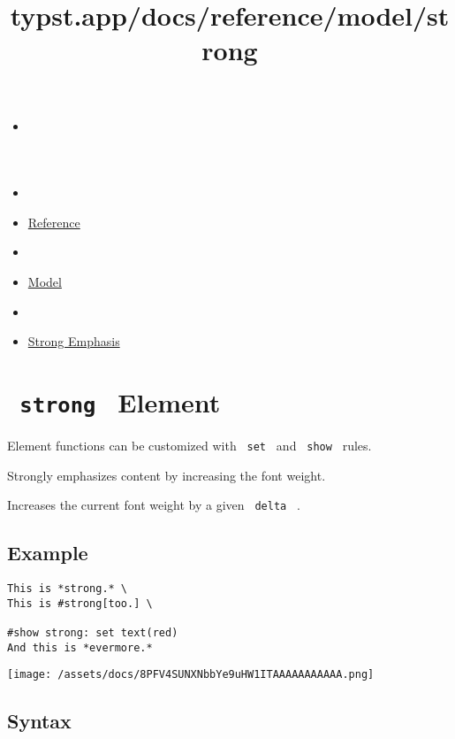 \title{typst.app/docs/reference/model/strong}

\begin{itemize}
\tightlist
\item
  \href{/docs}{}
\item
  
\item
  \href{/docs/reference/}{Reference}
\item
  
\item
  \href{/docs/reference/model/}{Model}
\item
  
\item
  \href{/docs/reference/model/strong/}{Strong Emphasis}
\end{itemize}

\section{\texorpdfstring{\texttt{\ strong\ } {{ Element
}}}{ strong   Element }}\label{summary}

\label{element-tooltip}
Element functions can be customized with \texttt{\ set\ } and
\texttt{\ show\ } rules.

Strongly emphasizes content by increasing the font weight.

Increases the current font weight by a given \texttt{\ delta\ } .

\subsection{Example}\label{example}

\begin{verbatim}
This is *strong.* \
This is #strong[too.] \

#show strong: set text(red)
And this is *evermore.*
\end{verbatim}

\texttt{[image: /assets/docs/8PFV4SUNXNbbYe9uHW1ITAAAAAAAAAAA.png]}

\subsection{Syntax}\label{syntax}

